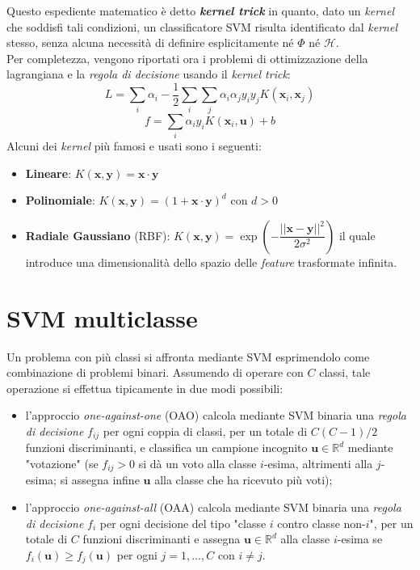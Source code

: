 Questo espediente matematico è detto \textbf{\emph{kernel trick}} in quanto, dato un \emph{kernel} che soddisfi tali condizioni, un classificatore SVM risulta identificato dal \emph{kernel} stesso, senza alcuna necessità di definire esplicitamente né $\Phi$ né $\mathcal{H}$.
\\
Per completezza, vengono riportati ora i problemi di ottimizzazione della lagrangiana e la \emph{regola di decisione} usando il \emph{kernel trick}:
\begin{equation}
\label{eq:lagrangiana_con_kernel}
L=\sum_i\alpha_i-\dfrac{1}{2}\sum_i\sum_j\alpha_i\alpha_jy_iy_jK(\mathbf{x}_i,\mathbf{x}_j)
\end{equation}
\begin{equation}
\label{eq:regola_di_decisione_con_kernel}
f=\sum_i\alpha_iy_iK(\mathbf{x}_i,\mathbf{u})+b
\end{equation}
Alcuni dei \emph{kernel} più famosi e usati sono i seguenti:
\begin{itemize}
\item \textbf{Lineare}: $K(\mathbf{x},\mathbf{y})=\mathbf{x}\cdot\mathbf{y}$
\item \textbf{Polinomiale}: $K(\mathbf{x},\mathbf{y})=\left (1+\mathbf{x}\cdot\mathbf{y}\right )^d$ con $d>0$
\item \textbf{Radiale Gaussiano} (RBF):  $K(\mathbf{x},\mathbf{y})=\exp\left (-\dfrac{\vert\vert\mathbf{x}-\mathbf{y}\vert\vert^2}{2\sigma^2}\right )$ il quale introduce una dimensionalità dello spazio delle \emph{feature} trasformate infinita.
\end{itemize}
\section{SVM multiclasse}
Un problema con più classi si affronta mediante SVM esprimendolo come combinazione di problemi binari. Assumendo di operare con $C$ classi, tale operazione si effettua tipicamente in due modi possibili:
\begin{itemize}
\item l'approccio \emph{one-against-one} (OAO) calcola mediante SVM binaria una \emph{regola di decisione} $f_{ij}$ per ogni coppia di classi, per un totale di $C(C-1)/2$ funzioni discriminanti, e classifica un campione incognito $\mathbf{u}\in\mathbb{R}^d$ mediante "votazione" (se $f_{ij}>0$ si dà un voto alla classe $i$-esima, altrimenti alla $j$-esima; si assegna infine $\mathbf{u}$ alla classe che ha ricevuto più voti);
\item l'approccio \emph{one-against-all} (OAA) calcola mediante SVM binaria una \emph{regola di decisione} $f_{i}$ per ogni decisione del tipo "classe $i$ contro classe non-$i$", per un totale di $C$ funzioni discriminanti e assegna $\mathbf{u}\in\mathbb{R}^d$ alla classe $i$-esima se $f_i(\mathbf{u})\geq f_j(\mathbf{u})$ per ogni $j=1,\ldots,C$ con $i\neq j$.
\end{itemize}

